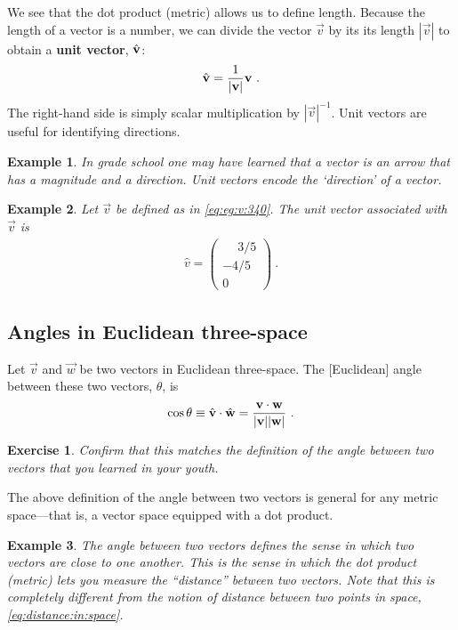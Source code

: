 \documentclass[12pt]{article}
\newtheorem{exercise}{Exercise}[section]
\newtheorem{example}{Example}[section]
\begin{document}
We see that the dot product (metric) allows us to define length. Because the length of a vector is a number, we can divide the vector $\vec{v}$ by its its length $|\vec{v}|$ to obtain a \textbf{unit vector}, ${\hat{\mathbf{v}}}$:
\begin{align}
    {\hat{\mathbf{v}}} = \frac{1}{|\mathbf{v}|}\mathbf{v} \ .
    \label{eq:eg:v:340}
\end{align}
The right-hand side is simply scalar multiplication by $|\vec{v}|^{-1}$. Unit vectors are useful for identifying directions.

\begin{example}
In grade school one may have learned that a vector is an arrow that has a magnitude and a direction. Unit vectors encode the `direction' of a vector.
\end{example}

\begin{example}
Let $\vec{v}$ be defined as in \eqref{eq:eg:v:340}. The unit vector associated with $\vec{v}$ is
\begin{align}
    \hat{v} = 
    \begin{pmatrix}
        \phantom{+}3/5 \\
        -4/5\\
        0
    \end{pmatrix} \ .
\end{align}

\end{example}


\subsection{Angles in Euclidean three-space}

Let $\vec{v}$ and $\vec{w}$ be two vectors in Euclidean three-space. The [Euclidean] angle between these two vectors, $\theta$, is 
\begin{align}
    \cos\theta \equiv {\hat{\mathbf{v}}}\cdot{\hat{\mathbf{w}}} = \frac{\mathbf{v}\cdot\mathbf{w}}{|\mathbf{v}||\mathbf{w}|} \ .
\end{align}
\label{eq:cos:theta:in:R3}
\begin{exercise}
Confirm that this matches the definition of the angle between two vectors that you learned in your youth.
\end{exercise}
The above definition of the angle between two vectors is general for any metric space---that is, a vector space equipped with a dot product. 

\begin{example}
The angle between two vectors defines the sense in which two vectors are close to one another. This is the sense in which the dot product (metric) lets you measure the ``distance'' between two vectors. Note that this is completely different from the notion of distance between two points in space, \eqref{eq:distance:in:space}. 
\end{example}
\end{document}
